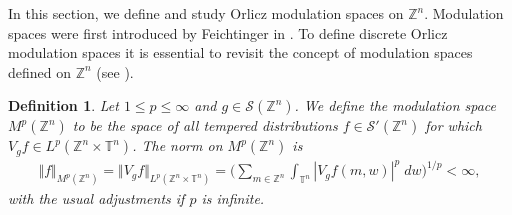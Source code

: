 \documentclass[a4paper,11pt, reqno]{amsart}
\theoremstyle{plain}
\newtheorem{Def}[theorem]{Definition}
\theoremstyle{definition}
\theoremstyle{remark}
\def \Z{{\mathbb Z}}
\def \T{{\mathbb T}}
\def\supp{\hbox{supp\,}}
\begin{document}
In this section, we define and study Orlicz modulation spaces on $\Z^n$. Modulation spaces were first introduced by Feichtinger in \cite{fei03, fei97}. To define discrete Orlicz modulation spaces it is essential to revisit the concept of modulation spaces defined on $\Z^n$ (see \cite{das23}). 
\begin{Def}
Let $1 \leq p \leq \infty$ and $g \in \mathcal{S}(\Z^n)$. We define the modulation space $M^{p}(\Z^n)$ to be the space of all tempered distributions $f \in \mathcal{S'}(\Z^n)$ for which $V_g f \in L^{p}(\Z^n \times \T^n)$. The norm on $M^{p}(\Z^n)$ is 
\begin{eqnarray*}
\Vert f \Vert_{M^{p}(\Z^n)} 
= \Vert V_g f \Vert_{L^{p}(\Z^n \times \T^n)} 
= \bigg( \sum_{m \in \Z^n} \int_{\T^n} |V_g f(m,w)|^p \; dw \bigg)^{1/p} < \infty,
\end{eqnarray*}
with the usual adjustments if $p$ is infinite.  
\end{Def}
\end{document}
